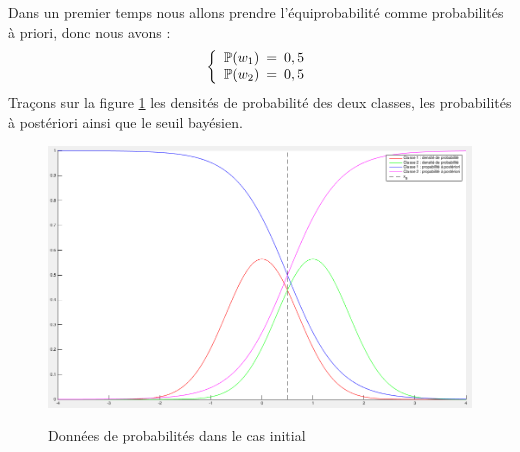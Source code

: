 \documentclass[11pt,a4paper]{article}
\begin{document}
Dans un premier temps nous allons prendre l'équiprobabilité comme probabilités à priori, donc nous avons :
$$
\left \{
\begin{array}{c @{\,\,\,=\,\,\,} c}
    \mathbb{P}(w_1) & 0,5\\
    \mathbb{P}(w_2) & 0,5
\end{array}
\right.
$$
Traçons sur la figure \ref{fig.exo1_graph1} les densités de probabilité des deux classes, les probabilités à postériori ainsi que le seuil bayésien.

\begin{figure}[H]
\center
\includegraphics[width=15cm]{exo1_graph1.png}
\label{fig.exo1_graph1}
\caption{Données de probabilités dans le cas initial}
\end{figure}
\end{document}
